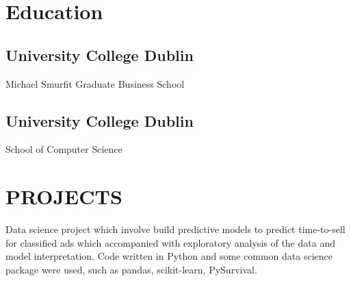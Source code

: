 \documentclass[]{ben-resume-openfont}
\begin{document}
%
%
\lastupdated

%
%

%
%

\begin{minipage}[t]{0.37\textwidth} 


\section{Education} 

\subsection{University College Dublin}
Michael Smurfit Graduate Business School\\
\sectionsep

\subsection{University College Dublin}
School of Computer Science \\
\sectionsep

\section{PROJECTS}
Data science project which involve build predictive models to predict time-to-sell for classified ads which accompanied with exploratory analysis of the data and model interpretation. Code written in Python and some common data science package were used, such as pandas, scikit-learn, PySurvival.
\sectionsep


\end{minipage}
\end{document}
